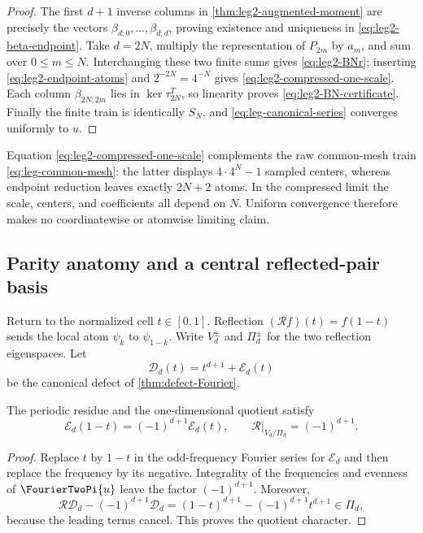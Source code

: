 \begin{proof}
The first $d+1$ inverse columns in
\cref{thm:leg2-augmented-moment} are precisely the vectors
$\beta_{d;0},\ldots,\beta_{d;d}$, proving existence and uniqueness in
\eqref{eq:leg2-beta-endpoint}.  Take $d=2N$, multiply the representation of
$P_{2m}$ by $a_m$, and sum over $0\le m\le N$.  Interchanging these two finite
sums gives \eqref{eq:leg2-BNr}; inserting
\eqref{eq:leg2-endpoint-atoms} and $2^{-2N}=4^{-N}$ gives
\eqref{eq:leg2-compressed-one-scale}.  Each column
$\beta_{2N;2m}$ lies in $\ker\tau_{2N}^T$, so linearity proves
\eqref{eq:leg2-BN-certificate}.  Finally the finite train is identically
$S_N$, and \eqref{eq:leg-canonical-series} converges uniformly to $u$.
\end{proof}

\begin{warning}
Equation \eqref{eq:leg2-compressed-one-scale} complements the raw common-mesh
train \eqref{eq:leg-common-mesh}: the latter displays $4\cdot4^N-1$ sampled
centers, whereas endpoint reduction leaves exactly $2N+2$ atoms.  In the
compressed limit the scale, centers, and coefficients all depend on $N$.
Uniform convergence therefore makes no coordinatewise or atomwise limiting
claim.
\end{warning}

\subsection{Parity anatomy and a central reflected-pair basis}

Return to the normalized cell $t\in[0,1]$.  Reflection
$(\mathcal Rf)(t)=f(1-t)$ sends the local atom $\psi_k$ to $\psi_{1-k}$.
Write $V_d^\pm$ and $\Pi_d^\pm$ for the two reflection eigenspaces.  Let
\[
 \mathcal D_d(t)=t^{d+1}+\mathcal E_d(t)
\]
be the canonical defect of \cref{thm:defect-Fourier}.

\begin{lemma}
\label{lem:leg2-defect-parity}
The periodic residue and the one-dimensional quotient satisfy
\begin{equation}
 \mathcal E_d(1-t)=(-1)^{d+1}\mathcal E_d(t),
 \qquad
 \mathcal R|_{V_d/\Pi_d}=(-1)^{d+1}.
 \label{eq:leg2-defect-parity}
\end{equation}
\end{lemma}

\begin{proof}
Replace $t$ by $1-t$ in the odd-frequency Fourier series for
$\mathcal E_d$ and then replace the frequency by its negative.  Integrality
of the frequencies and evenness of $\FourierTwoPi{u}$ leave the factor
$(-1)^{d+1}$.  Moreover,
\[
 \mathcal R\mathcal D_d-(-1)^{d+1}\mathcal D_d
 =(1-t)^{d+1}-(-1)^{d+1}t^{d+1}\in\Pi_d,
\]
because the leading terms cancel.  This proves the quotient character.
\end{proof}

